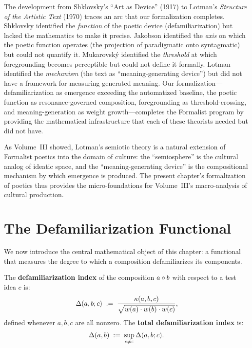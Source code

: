 \begin{remark}
\label{rem:formalist-arc}
The development from Shklovsky's ``Art as Device'' (1917) to Lotman's \textit{Structure of the Artistic Text} (1970) traces an arc that our formalization completes.  Shklovsky identified the \emph{function} of the poetic device (defamiliarization) but lacked the mathematics to make it precise.  Jakobson identified the \emph{axis} on which the poetic function operates (the projection of paradigmatic onto syntagmatic) but could not quantify it.  Mukarovsk\'y identified the \emph{threshold} at which foregrounding becomes perceptible but could not define it formally.  Lotman identified the \emph{mechanism} (the text as ``meaning-generating device'') but did not have a framework for measuring generated meaning.  Our formalization---defamiliarization as emergence exceeding the automatized baseline, the poetic function as resonance-governed composition, foregrounding as threshold-crossing, and meaning-generation as weight growth---completes the Formalist program by providing the mathematical infrastructure that each of these theorists needed but did not have.

As Volume~III showed, Lotman's semiotic theory is a natural extension of Formalist poetics into the domain of culture: the ``semiosphere'' is the cultural analog of ideatic space, and the ``meaning-generating device'' is the compositional mechanism by which emergence is produced.  The present chapter's formalization of poetics thus provides the micro-foundations for Volume~III's macro-analysis of cultural production.
\end{remark}


\section{The Defamiliarization Functional}

We now introduce the central mathematical object of this chapter: a functional
that measures the degree to which a composition defamiliarizes its components.

\begin{definition}
\label{def:defam-index}
The \textbf{defamiliarization index} of the composition $a \circ b$ with
respect to a test idea $c$ is:
\[
  \Delta(a, b; c) \;:=\; \frac{\kappa(a, b, c)}{\sqrt{w(a) \cdot w(b) \cdot w(c)}},
\]
defined whenever $a, b, c$ are all nonzero.  The \textbf{total defamiliarization
index} is:
\[
  \Delta(a, b) \;:=\; \sup_{c \neq \varepsilon} \Delta(a, b; c).
\]
\end{definition}

